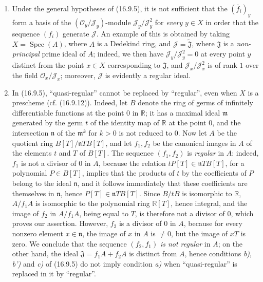 \begin{remarks}[16.9.6]
\label{IV.16.9.6}
\begin{enumerate}
  \item[(i)] Under the general hypotheses of (16.9.5), it is not sufficient
  that the $(\bar f_i)_y$ form a basis of the
  $(\mathcal{O}_y/\mathscr{J}_y)$-module
  $\mathscr{J}_y/\mathscr{J}_y^2$ for \emph{every} $y\in X$ in order that the
  sequence $(f_i)$ generate $\mathscr{J}$. An example of this is obtained by
  taking $X=\operatorname{Spec}(A)$, where $A$ is a Dedekind ring, and
  $\mathscr{J}=\widetilde{\mathfrak{J}}$, where $\mathfrak{J}$ is a
  \emph{non-principal} prime ideal of $A$; indeed, we then have
  $\mathscr{J}_y/\mathscr{J}_y^2=0$ at every point $y$ distinct from the point
  $x\in X$ corresponding to $\mathfrak{J}$, and
  $\mathscr{J}_x/\mathscr{J}_x^2$ is of rank $1$ over the field
  $\mathcal{O}_x/\mathscr{J}_x$; moreover, $\mathscr{J}$ is evidently a
  regular ideal.
  \item[(ii)] In (16.9.5), ``quasi-regular'' cannot be replaced by
  ``regular'', even when $X$ is a prescheme (cf. (16.9.12)).
  Indeed, let $B$ denote the ring of germs of infinitely
  differentiable functions at the point $0$ in $\mathbb{R}$; it has a maximal
  ideal $\mathfrak{m}$ generated by the germ $t$ of the identity map of
  $\mathbb{R}$ at the point $0$, and the intersection $\mathfrak{n}$ of the
  $\mathfrak{m}^k$ for $k>0$ is not reduced to $0$. Now let $A$ be
  the quotient ring $B[T]/\mathfrak{n}TB[T]$, and let $f_1,f_2$ be the
  canonical images in $A$ of the elements $t$ and $T$ of $B[T]$. The sequence
  $(f_1,f_2)$ is \emph{regular} in $A$: indeed, $f_1$ is not a divisor of
  $0$ in $A$, because the relation $tP[T]\in\mathfrak{n}TB[T]$, for a
  polynomial $P\in B[T]$, implies that the products of $t$ by the coefficients
  of $P$ belong to the ideal $\mathfrak{n}$, and it follows immediately that
  these coefficients are themselves in $\mathfrak{n}$, hence
  $P[T]\in\mathfrak{n}TB[T]$. Since $B/tB$ is isomorphic to $\mathbb{R}$,
  $A/f_1A$ is isomorphic to the polynomial ring $\mathbb{R}[T]$, hence
  integral, and the image of $f_2$ in $A/f_1A$, being equal to $T$, is
  therefore not a divisor of $0$, which proves our assertion. However, $f_2$
  is a divisor of $0$ in $A$, because for every nonzero element
  $x\in\mathfrak{n}$, the image of $x$ in $A$ is $\ne0$, but the image of $xT$
  is zero. We conclude that the sequence $(f_2,f_1)$ \emph{is not regular} in $A$;
  on the other hand, the ideal $\mathfrak{J}=f_1A+f_2A$ is distinct from $A$,
  hence conditions \emph{b)}, \emph{b')} and \emph{c)} of (16.9.5) do not imply condition \emph{a)}
  when ``quasi-regular'' is replaced in it by ``regular''.
\end{enumerate}
\end{remarks}

